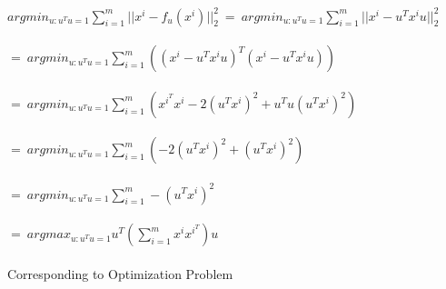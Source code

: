 \newcommand\tab[1][1cm]{\hspace*{#1}}
\begin{answer}
\\ \\
\tab$argmin_{u:u^Tu=1} \sum_{i=1}^m ||  x^i - f_u(x^i) ||_2^2 \ = \ argmin_{u:u^Tu=1} \sum_{i=1}^m ||  x^i - u^Tx^iu ||_2^2$\\ \\
\tab[3cm]$ = \ argmin_{u:u^Tu=1} \sum_{i=1}^m  ((x^i - u^Tx^iu)^T (x^i - u^Tx^iu) )$\\ \\
\tab[3cm]$ = \ argmin_{u:u^Tu=1} \sum_{i=1}^m  ( x^{i^T}x^i - 2(u^Tx^i)^2 + u^Tu(u^Tx^i)^2  )$\\ \\
\tab[3cm]$ = \ argmin_{u:u^Tu=1} \sum_{i=1}^m  ( - 2(u^Tx^i)^2 + (u^Tx^i)^2  )$\\ \\
\tab[3cm]$ = \ argmin_{u:u^Tu=1} \sum_{i=1}^m   - (u^Tx^i)^2   $\\ \\
\tab[3cm]$ = \ argmax_{u:u^Tu=1} u^T ( \sum_{i=1}^m  x^ix^{i^T}  )u$\\ \\
Corresponding to Optimization Problem \\ \\
\end{answer}
